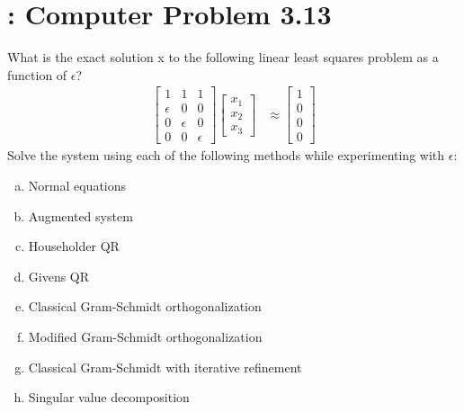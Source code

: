 \documentclass[paper=a4, fontsize=11pt]{scrartcl}
\numberwithin{equation}{section}		%
\numberwithin{figure}{section}			%
\numberwithin{table}{section}				%
\begin{document}
\section{: Computer Problem 3.13}
What is the exact solution x to the following linear least squares problem as a function of $\epsilon$?
\begin{align}
	\begin{bmatrix}
		1 & 1 & 1 \\ \epsilon & 0 & 0 \\ 0 & \epsilon & 0 \\ 0 & 0 & \epsilon
	\end{bmatrix}
	\begin{bmatrix}
		x_1 \\ x_2 \\ x_3
	\end{bmatrix}
	&\approx
	\begin{bmatrix}
		1 \\ 0 \\ 0 \\ 0
	\end{bmatrix}
\end{align}
Solve the system using each of the following methods while experimenting with $\epsilon$:
\begin{enumerate}[(a)]
	\item Normal equations \vspace{-2mm}
	\item Augmented system \vspace{-2mm}
	\item Householder QR \vspace{-2mm}
	\item Givens QR \vspace{-2mm}
	\item Classical Gram-Schmidt orthogonalization \vspace{-2mm}
	\item Modified Gram-Schmidt orthogonalization \vspace{-2mm}
	\item Classical Gram-Schmidt with iterative refinement \vspace{-2mm}
	\item Singular value decomposition \vspace{-2mm}
\end{enumerate}

\vspace{4mm}
\end{document}

